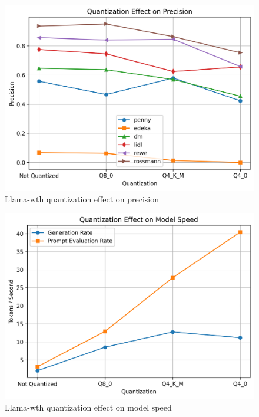 \documentclass[licencjacka,en]{pracamgr}
\begin{document}
\begin{appendices}
\begin{figure}[h]
    \centering
    \includegraphics[width=0.8\linewidth]{bachelor_images/quant_comp/quantization_effect_on_precision.png}
    \caption{Llama-wth quantization effect on precision}
    \label{fig:quantization_effect_on_precision}
\end{figure}

\begin{figure}[h]
    \centering
    \includegraphics[width=0.8\linewidth]{bachelor_images/quant_comp/quantization_effect_on_model_speed.png}
    \caption{Llama-wth quantization effect on model speed}
    \label{fig:quantization_effect_on_model_speed}
\end{figure}


\end{appendices}
\end{document}
